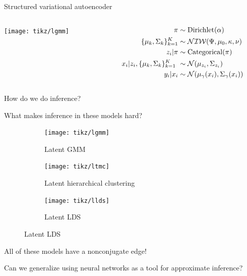 \documentclass[10pt, compress]{beamer}
\begin{document}
\begin{frame}{Structured variational autoencoder}
  \centering
  \begin{columns}
    \begin{column}{0.3\textwidth}
      \texttt{[image: tikz/lgmm]}
    \end{column}
    \begin{column}{0.3\textwidth}
      \begin{align*}
        \pi &\sim \textrm{Dirichlet}(\alpha) \\
        \{\mu_k, \Sigma_k\}_{k = 1}^K &\sim \mathcal{NIW}(\Psi, \mu_0, \kappa, \nu) \\
        z_i | \pi &\sim \textrm{Categorical}(\pi) \\
        x_i | z_i, \{\mu_k, \Sigma_k\}_{k = 1}^K \ &\sim \mathcal{N}(\mu_{z_i}, \Sigma_{z_i}) \\
        y_i | x_i &\sim \mathcal{N}(\mu_\gamma(x_i), \Sigma_\gamma(x_i))
      \end{align*}
    \end{column}
  \end{columns}
  \pause
  How do we do inference?
\end{frame}

\begin{frame}{What makes inference in these models hard?}
  \begin{figure}
    \centering
    \begin{subfigure}[t]{0.23\textwidth}
        \centering
        \texttt{[image: tikz/lgmm]}
        \caption*{Latent GMM}
    \end{subfigure}
    \hfill
    \begin{subfigure}[t]{0.23\textwidth}
        \centering
        \texttt{[image: tikz/ltmc]}
        \caption*{Latent hierarchical clustering}
    \end{subfigure}
    \hfill
    \begin{subfigure}[t]{0.23\textwidth}
        \centering
        \texttt{[image: tikz/llds]}
        \caption*{Latent LDS}
    \end{subfigure}
  \end{figure}
  \pause
  \centering
  All of these models have a \alert{nonconjugate} edge!
\end{frame}

\begin{frame}[standout]
  \centering
  Can we generalize using neural networks as a tool
  for approximate inference?
\end{frame}
\end{document}
